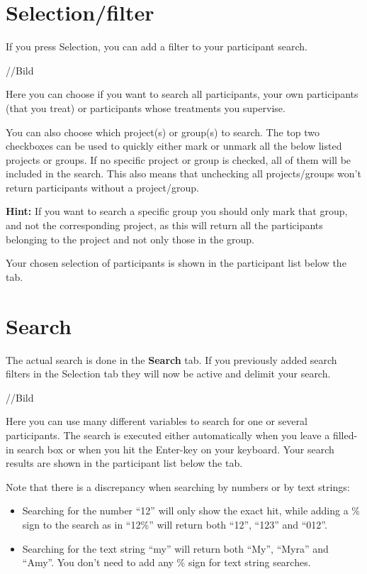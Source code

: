 \documentclass[]{book}
\begin{document}
\hypertarget{selectionfilter}{%
\section{Selection/filter}\label{selectionfilter}}

If you press Selection, you can add a filter to your participant search.

//Bild

Here you can choose if you want to search all participants, your own participants (that you treat) or participants whose treatments you supervise.

You can also choose which project(s) or group(s) to search. The top two checkboxes can be used to quickly either mark or unmark all the below listed projects or groups. If no specific project or group is checked, all of them will be included in the search. This also means that unchecking all projects/groups won't return participants without a project/group.

\textbf{Hint:} If you want to search a specific group you should only mark that group, and not the corresponding project, as this will return all the participants belonging to the project and not only those in the group.

Your chosen selection of participants is shown in the participant list below the tab.

\hypertarget{search}{%
\section{Search}\label{search}}

The actual search is done in the \textbf{Search} tab. If you previously added search filters in the Selection tab they will now be active and delimit your search.

//Bild

Here you can use many different variables to search for one or several participants. The search is executed either automatically when you leave a filled-in search box or when you hit the Enter-key on your keyboard. Your search results are shown in the participant list below the tab.

Note that there is a discrepancy when searching by numbers or by text strings:

\begin{itemize}
\item
  Searching for the number ``12'' will only show the exact hit, while adding a \% sign to the search as in ``12\%'' will return both ``12'', ``123'' and ``012''.
\item
  Searching for the text string ``my'' will return both ``My'', ``Myra'' and ``Amy''. You don't need to add any \% sign for text string searches.
\end{itemize}
\end{document}

